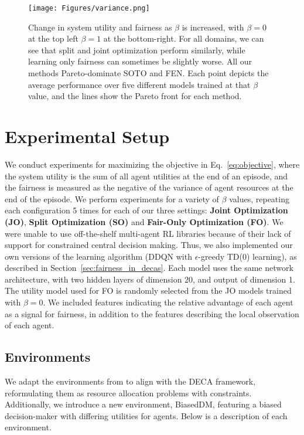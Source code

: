 

\begin{figure*}[ht]
    \centering
    \texttt{[image: Figures/variance.png]}
    \caption{Change in system utility and fairness as $\beta$ is increased, with $\beta=0$ at the top left $\beta=1$ at the bottom-right. For all domains, we can see that split and joint optimization perform similarly, while learning only fairness can sometimes be slightly worse. All our methods Pareto-dominate SOTO and FEN. Each point depicts the average performance over five different models trained at that $\beta$ value, and the lines show the Pareto front for each method.}
    \label{fig:main_results}
\end{figure*}

\section{Experimental Setup}

We conduct experiments for maximizing the objective in Eq.~\ref{eq:objective}, where the system utility is the sum of all agent utilities at the end of an episode, and the fairness is measured as the negative of the variance of agent resources at the end of the episode. We perform experiments for a variety of $\beta$ values, repeating each configuration 5 times for each of our three settings: \textbf{Joint Optimization (JO)}, \textbf{Split Optimization (SO)} and \textbf{Fair-Only Optimization (FO)}. 
We were unable to use off-the-shelf multi-agent RL libraries because of their lack of support for constrained central decision making. Thus, we also implemented our own versions of the learning algorithm (DDQN with $\epsilon$-greedy TD(0) learning), as described in Section~\ref{sec:fairness_in_decas}.
Each model uses the same network architecture, with two hidden layers of dimension 20, and  output of dimension 1.
The utility model used for FO is randomly selected from the JO models trained with $\beta=0$. We included features indicating the relative advantage of each agent as a signal for fairness, in addition to the features describing the local observation of each agent.

\subsection{Environments}
We adapt the environments from \citet{jiang2019FEN} to align with the DECA framework, reformulating them as resource allocation problems with constraints. Additionally, we introduce a new environment, BiasedDM, featuring a biased decision-maker with differing utilities for agents. Below is a description of each environment.

